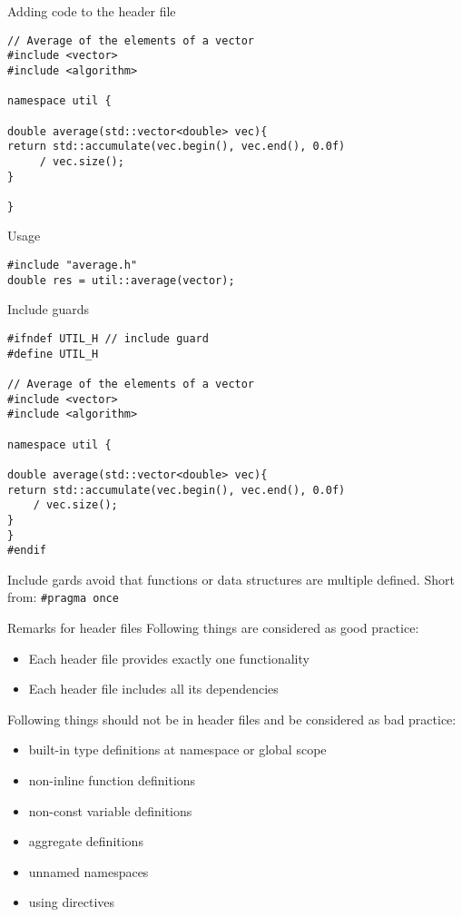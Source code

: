 \documentclass[\classoption]{beamer}
\begin{document}
\begin{frame}[fragile]{Adding code to the header file}
\begin{lstlisting}
// Average of the elements of a vector
#include <vector>
#include <algorithm>

namespace util {

double average(std::vector<double> vec){
return std::accumulate(vec.begin(), vec.end(), 0.0f) 
     / vec.size();
}

}
\end{lstlisting}
\begin{block}{Usage}
\begin{lstlisting}
#include "average.h"
double res = util::average(vector);
\end{lstlisting}
\end{block}
\end{frame}


\begin{frame}[fragile]{Include guards}
\begin{lstlisting}
#ifndef UTIL_H // include guard
#define UTIL_H

// Average of the elements of a vector
#include <vector>
#include <algorithm>

namespace util {

double average(std::vector<double> vec){
return std::accumulate(vec.begin(), vec.end(), 0.0f) 
    / vec.size();
}
}
#endif
\end{lstlisting}
Include gards avoid that functions or data structures are multiple defined. Short from: \lstinline|#pragma once|
\end{frame}

\begin{frame}{Remarks for header files}
Following things are considered as good practice:
\begin{itemize}
\item Each header file provides exactly one functionality 
\item Each header file includes all its dependencies
\end{itemize}
\vspace{0.25cm}
Following things should not be in header files and be considered as bad practice:
\begin{itemize}
\item built-in type definitions at namespace or global scope
\item non-inline function definitions
\item non-const variable definitions
\item aggregate definitions
\item unnamed namespaces
\item using directives
\end{itemize}

\end{frame}
\end{document}
